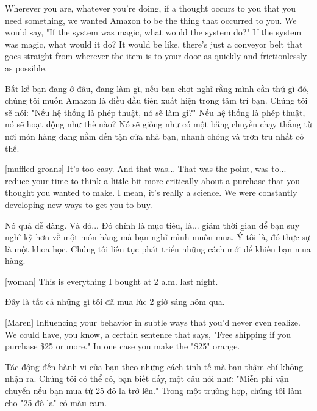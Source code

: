 \documentclass[a4paper]{article}
\begin{document}
	Wherever you are, whatever you're doing, if a thought occurs to you that you need something, we wanted Amazon to be the thing that occurred to you.
	We would say, "If the system was magic, what would the system do?"
	If the system was magic, what would it do? It would be like, there's just a conveyor belt that goes straight from wherever the item is to your door as quickly and frictionlessly as possible.
	
	
	\begin{vietnamese-v2}
		Bất kể bạn đang ở đâu, đang làm gì, nếu bạn chợt nghĩ rằng mình cần thứ gì đó, chúng tôi muốn Amazon là điều đầu tiên xuất hiện trong tâm trí bạn. Chúng tôi sẽ nói: "Nếu hệ thống là phép thuật, nó sẽ làm gì?" 
		Nếu hệ thống là phép thuật, nó sẽ hoạt động như thế nào? Nó sẽ giống như có một băng chuyền chạy thẳng từ nơi món hàng đang nằm đến tận cửa nhà bạn, nhanh chóng và trơn tru nhất có thể.
	\end{vietnamese-v2}
	
	[muffled groans]
	It's too easy. And that was... That was the point, was to... reduce your time to think a little bit more critically about a purchase that you thought you wanted to make.
	I mean, it's really a science.
	We were constantly developing new ways to get you to buy.
	
	
	\begin{vietnamese-v2}
		Nó quá dễ dàng. Và đó... Đó chính là mục tiêu, là... giảm thời gian để bạn suy nghĩ kỹ hơn về một món hàng mà bạn nghĩ mình muốn mua. 
		Ý tôi là, đó thực sự là một khoa học. 
		Chúng tôi liên tục phát triển những cách mới để khiến bạn mua hàng.
	\end{vietnamese-v2}
	
	[woman] This is everything I bought at 2 a.m. last night.
	
	\begin{vietnamese-v2}
		 Đây là tất cả những gì tôi đã mua lúc 2 giờ sáng hôm qua.
	\end{vietnamese-v2}
	
	[Maren] Influencing your behavior in subtle ways that you'd never even realize. We could have, you know, a certain sentence that says, "Free shipping if you purchase \$25 or more." In one case you make the "\$25" orange.

	\begin{vietnamese-v2}
		[Maren] Tác động đến hành vi của bạn theo những cách tinh tế mà bạn thậm chí không nhận ra. Chúng tôi có thể có, bạn biết đấy, một câu nói như: "Miễn phí vận chuyển nếu bạn mua từ 25 đô la trở lên." Trong một trường hợp, chúng tôi làm cho "25 đô la" có màu cam.
	\end{vietnamese-v2}
\end{document}
